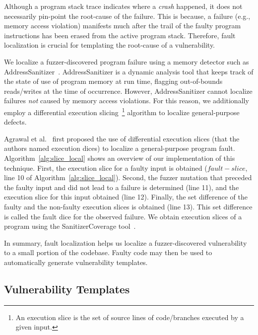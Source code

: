 Although a program stack trace indicates where a {\it crash} happened, it does not necessarily pin-point the root-cause of the failure.
This is because, a failure (e.g., memory access violation) manifests much after the trail of the faulty program instructions has been erased from the active program stack.
Therefore, fault localization is crucial for templating the root-cause of a vulnerability.

We localize a fuzzer-discovered program failure using a memory detector such as AddressSanitizer~\cite{asanfull}.
AddressSanitizer is a dynamic analysis tool that keeps track of the state of use of program memory at run time, flagging out-of-bounds reads/writes at the time of occurrence.
However, AddressSanitizer cannot localize failures {\it not} caused by memory access violations.
For this reason, we additionally employ a differential execution slicing~\footnote{An execution slice is the set of source lines of code/branches executed by a given input.} algorithm to localize general-purpose defects.

Agrawal et al.~\cite{agrawal1995fault} first proposed the use of differential execution slices (that the authors named execution dices) to localize a general-purpose program fault.
Algorithm~\ref{alg:slice_local} shows an overview of our implementation of this technique.
First, the execution slice for a faulty input is obtained ($fault-slice$, line 10 of Algorithm~\ref{alg:slice_local}).
Second, the fuzzer mutation that preceded the faulty input and did not lead to a failure is determined (line 11), and the execution slice for this input obtained (line 12).
Finally, the set difference of the faulty and the non-faulty execution slices is obtained (line 13).
This set difference is called the fault dice for the observed failure.
We obtain execution slices of a program using the SanitizerCoverage tool~\cite{coveragesan}.

In summary, fault localization helps us localize a fuzzer-discovered vulnerability to a small portion of the codebase.
Faulty code may then be used to automatically generate vulnerability templates.

\subsection{Vulnerability Templates}
\label{sec:traversals}


